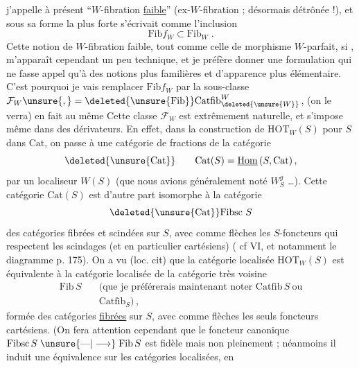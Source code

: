  j'appelle à présent ``$W$-fibration \uline{faible}'' \deleted{\unsure{,}}
(ex-$W$-fibration ; désormais détrônée !), et
sous sa forme la plus forte s'écrivait comme
l'inclusion
\[
\mathrm{Fib}f_W\subset\mathrm{Fib}_W\;.
\]
Cette notion de $W$-fibration faible, tout comme
celle de morphisme $W$-parfait, si 
, m'apparaît cependant un
peu technique, et je préfère donner
une formulation qui ne fasse appel
qu'à des notions plus familières et
d'apparence plus élémentaire. C'est pourquoi
je  vais remplacer $\mathrm{Fib}f_W$ par
la sous-classe $\mathcal F_W\unsure{,}=\deleted{\unsure{\mathrm{Fib}}}\mathrm{Catfib}^{W}_{\deleted{\unsure{W}}}$,  
(on le verra)   en fait au même
Cette classe $\mathcal F_W$ est extrêmement naturelle, et
s'impose même dans   des dérivateurs.
En effet, dans la construction de
$\mathrm{HOT}_W(S)$ pour $S$ dans $\mathrm{Cat}$, on passe
à une catégorie de fractions de la catégorie
\[
\deleted{\unsure{\mathrm{Cat}}}\qquad\mathrm{Cat}(S)=\underline{\mathrm{Hom}}\,(S,\mathrm{Cat})\,,
\]
par un localiseur $W(S)$ (que nous
avions généralement noté $W^{g}_S$  \ldots). Cette
catégorie  $\mathrm{Cat}(S)$ est d'autre part
isomorphe à la catégorie
\[
\deleted{\unsure{\mathrm{Cat}}}\mathrm{Fibsc}\ S
\]
des catégories fibrées et scindées sur $S$, avec
comme flèches les $S$-foncteurs qui respectent
les scindages (et en particulier cartésiens)
(\unsure{--} cf VI, et notamment le diagramme p. 175).
On a vu (loc. cit) que  la catégorie
localisée $\mathrm{HOT}_W(S)$ est équivalente à la
catégorie localisée de la catégorie très voisine
\[
\begin{aligned}
\mathrm{Fib}\, S\quad &\text{(que je préférerais maintenant noter }\mathrm{Catfib}\,S\ \text{ou}\\
&\mathrm{Catfib}_S)\,,
\end{aligned}
\]
formée des catégories \uline{fibrées} sur $S$, avec comme
flèches les seuls foncteurs cartésiens. (On fera
attention cependant que le foncteur canonique
$\mathrm{Fibsc}\,S\mathrel{\unsure{\text{---}|\longrightarrow}}\mathrm{Fib}\,S$ est fidèle mais non pleinement ; néanmoins il induit une équivalence sur les catégories localisées, \deleted{\unsure{)}} en
